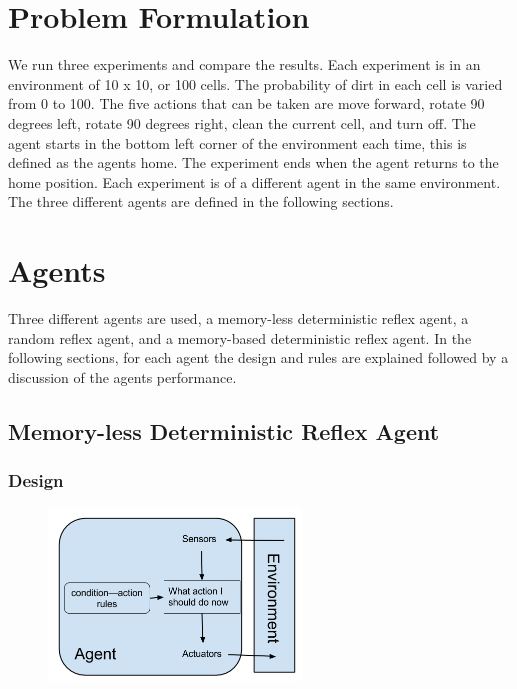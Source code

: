 \documentclass[a4paper,10pt]{article}
\begin{document}
\section{Problem Formulation}
We run three experiments and compare the results.
Each experiment is in an environment of 10 x 10, or 100 cells.
The probability of dirt in each cell is varied from 0 to 100.
The five actions that can be taken are move forward, rotate 90 degrees left, rotate 90 degrees right, clean the current cell, and turn off.
The agent starts in the bottom left corner of the environment each time, this is defined as the agents home.
The experiment ends when the agent returns to the home position.
Each experiment is of a different agent in the same environment.
The three different agents are defined in the following sections.

\section{Agents}
Three different agents are used, a memory-less deterministic reflex agent, a random reflex agent, and a memory-based deterministic reflex agent.
In the following sections, for each agent the design and rules are explained followed by a discussion of the agents performance.
\subsection{Memory-less Deterministic Reflex Agent}
\subsubsection{Design}
\begin{figure}[H]
	\begin{center}
		\includegraphics[width=0.6\textwidth]{MemorylessReflex.png}
	\end{center}
\end{figure}
\end{document}
